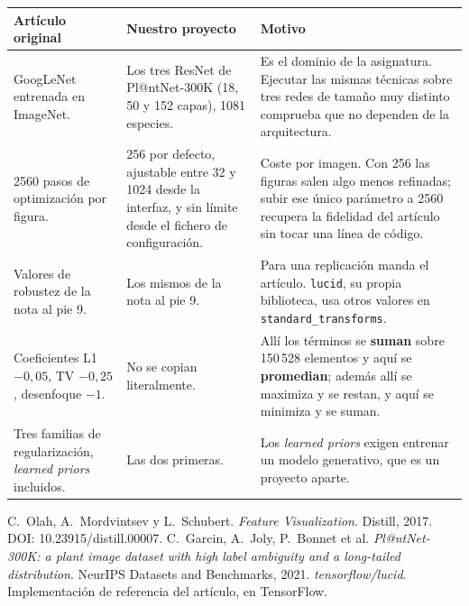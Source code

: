 \documentclass[11pt,a4paper]{article}
\begin{document}
\begin{table}[htb]
\centering\small
\begin{tabular}{L{4.6cm} L{4.6cm} L{5.6cm}}
\toprule
\textbf{Artículo original} & \textbf{Nuestro proyecto} & \textbf{Motivo} \\
\midrule
GoogLeNet entrenada en ImageNet. & Los tres ResNet de Pl@ntNet-300K (18, 50
y 152 capas), 1081 especies. & Es el dominio de la asignatura. Ejecutar las
mismas técnicas sobre tres redes de tamaño muy distinto comprueba que no
dependen de la arquitectura. \\
2560 pasos de optimización por figura. & 256 por defecto, ajustable entre
32 y 1024 desde la interfaz, y sin límite desde el fichero de
configuración. & Coste por imagen. Con 256 las figuras salen algo menos
refinadas; subir ese único parámetro a 2560 recupera la fidelidad del
artículo sin tocar una línea de código. \\
Valores de robustez de la nota al pie 9. & Los mismos de la nota al pie 9.
& Para una replicación manda el artículo. \texttt{lucid}, su propia
biblioteca, usa otros valores en \texttt{standard\_transforms}. \\
Coeficientes L1 $-0{,}05$, TV $-0{,}25$, desenfoque $-1$. & No se copian
literalmente. & Allí los términos se \textbf{suman} sobre 150\,528 elementos
y aquí se \textbf{promedian}; además allí se maximiza y se restan, y aquí se
minimiza y se suman. \\
Tres familias de regularización, \emph{learned priors} incluidos. & Las dos
primeras. & Los \emph{learned priors} exigen entrenar un modelo generativo,
que es un proyecto aparte. \\
\bottomrule
\end{tabular}
\end{table}

\begin{thebibliography}{9}\small
{} C.~Olah, A.~Mordvintsev y L.~Schubert.
\emph{Feature Visualization}. Distill, 2017. DOI: 10.23915/distill.00007.
 C.~Garcin, A.~Joly, P.~Bonnet et al.
\emph{Pl@ntNet-300K: a plant image dataset with high label ambiguity and a
long-tailed distribution}. NeurIPS Datasets and Benchmarks, 2021.
 \emph{tensorflow/lucid}. Implementación de referencia del
artículo, en TensorFlow.
\end{thebibliography}
\end{document}
